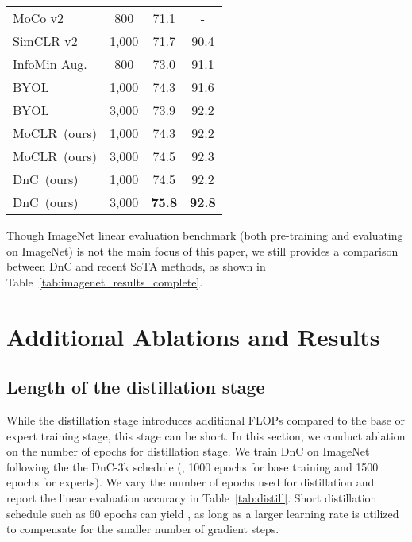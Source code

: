 \documentclass[final]{cvpr}
\newcommand\baseline{MoCLR}
\begin{document}
\begin{table}[t]
\begin{center}
\begin{small}
\begin{tabular}{lccc}
MoCo v2 \cite{chen2020improved} & \hspace{1.5ex}800 & 71.1 & - \\
SimCLR v2 \cite{chen2020big} & 1,000 & 71.7 & 90.4\\
InfoMin Aug. \cite{tian2020makes} & \hspace{1.5ex}800 & 73.0 & 91.1 \\
BYOL \cite{grill2020bootstrap} & 1,000 & 74.3 & 91.6\\
BYOL \cite{grill2020bootstrap} & 3,000 & 73.9 & 92.2 \\
\baseline{}~(ours)  & 1,000 & 74.3 & 92.2 \\
\baseline{}~(ours)  & 3,000 & 74.5 & 92.3 \\
DnC~(ours)          & 1,000 & \cellcolor{DnCBG}74.5 & \cellcolor{DnCBG}92.2 \\
DnC~(ours) & 3,000 & \cellcolor{DnCBG}\textbf{75.8} & \cellcolor{DnCBG}\textbf{92.8} \\
\bottomrule
\end{tabular}
\end{small}
\end{center}
\end{table} 
Though ImageNet linear evaluation benchmark (both pre-training and evaluating on ImageNet) is not the main focus of this paper, we still provides a comparison between DnC and recent SoTA methods, as shown in Table~\ref{tab:imagenet_results_complete}.


\section{Additional Ablations and Results}

\subsection{Length of the distillation stage}
While the distillation stage introduces additional FLOPs compared to the base or expert training stage, this stage can be short. In this section, we conduct ablation on the number of epochs for distillation stage. We train DnC on ImageNet following the the DnC-3k schedule (\ie, 1000 epochs for base training and 1500 epochs for experts). We vary the number of epochs used for distillation and report the linear evaluation accuracy in Table~\ref{tab:distill}. Short distillation schedule such as 60 epochs can yield , as long as a larger learning rate is utilized to compensate for the smaller number of gradient steps.
\end{document}

